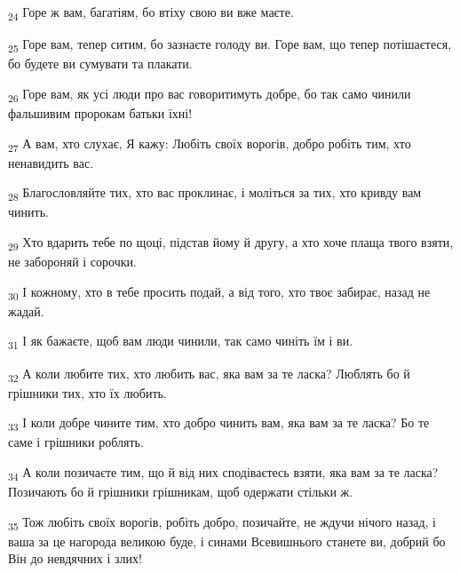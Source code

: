\begin{tcolorbox}
\textsubscript{24} Горе ж вам, багатіям, бо втіху свою ви вже маєте.
\end{tcolorbox}
\begin{tcolorbox}
\textsubscript{25} Горе вам, тепер ситим, бо зазнаєте голоду ви. Горе вам, що тепер потішаєтеся, бо будете ви сумувати та плакати.
\end{tcolorbox}
\begin{tcolorbox}
\textsubscript{26} Горе вам, як усі люди про вас говоритимуть добре, бо так само чинили фальшивим пророкам батьки їхні!
\end{tcolorbox}
\begin{tcolorbox}
\textsubscript{27} А вам, хто слухає, Я кажу: Любіть своїх ворогів, добро робіть тим, хто ненавидить вас.
\end{tcolorbox}
\begin{tcolorbox}
\textsubscript{28} Благословляйте тих, хто вас проклинає, і моліться за тих, хто кривду вам чинить.
\end{tcolorbox}
\begin{tcolorbox}
\textsubscript{29} Хто вдарить тебе по щоці, підстав йому й другу, а хто хоче плаща твого взяти, не забороняй і сорочки.
\end{tcolorbox}
\begin{tcolorbox}
\textsubscript{30} І кожному, хто в тебе просить подай, а від того, хто твоє забирає, назад не жадай.
\end{tcolorbox}
\begin{tcolorbox}
\textsubscript{31} І як бажаєте, щоб вам люди чинили, так само чиніть їм і ви.
\end{tcolorbox}
\begin{tcolorbox}
\textsubscript{32} А коли любите тих, хто любить вас, яка вам за те ласка? Люблять бо й грішники тих, хто їх любить.
\end{tcolorbox}
\begin{tcolorbox}
\textsubscript{33} І коли добре чините тим, хто добро чинить вам, яка вам за те ласка? Бо те саме і грішники роблять.
\end{tcolorbox}
\begin{tcolorbox}
\textsubscript{34} А коли позичаєте тим, що й від них сподіваєтесь взяти, яка вам за те ласка? Позичають бо й грішники грішникам, щоб одержати стільки ж.
\end{tcolorbox}
\begin{tcolorbox}
\textsubscript{35} Тож любіть своїх ворогів, робіть добро, позичайте, не ждучи нічого назад, і ваша за це нагорода великою буде, і синами Всевишнього станете ви, добрий бо Він до невдячних і злих!
\end{tcolorbox}
